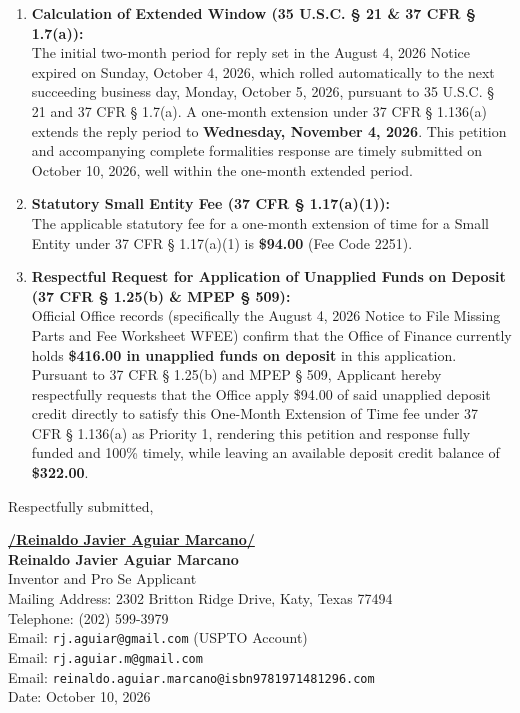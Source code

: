 \documentclass[11pt,letterpaper]{article}
\begin{document}
\begin{enumerate}[leftmargin=*]
    \item \textbf{Calculation of Extended Window (35 U.S.C. \S{} 21 \& 37 CFR \S{} 1.7(a)):} \\
    The initial two-month period for reply set in the August 4, 2026 Notice expired on Sunday, October 4, 2026, which rolled automatically to the next succeeding business day, Monday, October 5, 2026, pursuant to 35 U.S.C. \S{} 21 and 37 CFR \S{} 1.7(a). A one-month extension under 37 CFR \S{} 1.136(a) extends the reply period to \textbf{Wednesday, November 4, 2026}. This petition and accompanying complete formalities response are timely submitted on October 10, 2026, well within the one-month extended period.

    \item \textbf{Statutory Small Entity Fee (37 CFR \S{} 1.17(a)(1)):} \\
    The applicable statutory fee for a one-month extension of time for a Small Entity under 37 CFR \S{} 1.17(a)(1) is \textbf{\$94.00} (Fee Code 2251).

    \item \textbf{Respectful Request for Application of Unapplied Funds on Deposit (37 CFR \S{} 1.25(b) \& MPEP \S{} 509):} \\
    Official Office records (specifically the August 4, 2026 Notice to File Missing Parts and Fee Worksheet WFEE) confirm that the Office of Finance currently holds \textbf{\$416.00 in unapplied funds on deposit} in this application. Pursuant to 37 CFR \S{} 1.25(b) and MPEP \S{} 509, Applicant hereby respectfully requests that the Office apply \$94.00 of said unapplied deposit credit directly to satisfy this One-Month Extension of Time fee under 37 CFR \S{} 1.136(a) as Priority 1, rendering this petition and response fully funded and 100\% timely, while leaving an available deposit credit balance of \textbf{\$322.00}.
\end{enumerate}

\vspace{0.6cm}
\begin{singlespace}
\noindent Respectfully submitted, \par\vspace{0.8cm}
\underline{\textbf{/Reinaldo Javier Aguiar Marcano/}} \\
\textbf{Reinaldo Javier Aguiar Marcano} \\
Inventor and Pro Se Applicant \\
Mailing Address: 2302 Britton Ridge Drive, Katy, Texas 77494 \\
Telephone: (202) 599-3979 \\
Email: \texttt{rj.aguiar@gmail.com} (USPTO Account) \\
Email: \texttt{rj.aguiar.m@gmail.com} \\
Email: \texttt{reinaldo.aguiar.marcano@isbn9781971481296.com} \\
Date: October 10, 2026
\end{singlespace}
\end{document}
